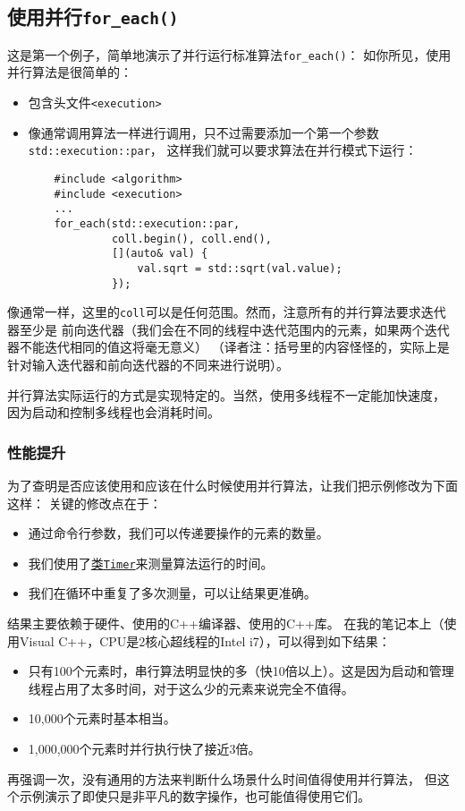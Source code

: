 \subsection{使用并行\texttt{for\_each()}}
这是第一个例子，简单地演示了并行运行标准算法\texttt{for\_each()}：
如你所见，使用并行算法是很简单的：
\begin{itemize}
    \item 包含头文件\texttt{<execution>}
    \item 像通常调用算法一样进行调用，只不过需要添加一个第一个参数\texttt{std::execution::par}，
    这样我们就可以要求算法在并行模式下运行：
    \begin{lstlisting}
    #include <algorithm>
    #include <execution>
    ...
    for_each(std::execution::par,
             coll.begin(), coll.end(),
             [](auto& val) {
                 val.sqrt = std::sqrt(val.value);
             });
    \end{lstlisting}
\end{itemize}
像通常一样，这里的\texttt{coll}可以是任何范围。然而，注意所有的并行算法要求迭代器至少是
前向迭代器（我们会在不同的线程中迭代范围内的元素，如果两个迭代器不能迭代相同的值这将毫无意义）
（译者注：括号里的内容怪怪的，实际上是针对输入迭代器和前向迭代器的不同来进行说明）。

并行算法实际运行的方式是实现特定的。当然，使用多线程不一定能加快速度，
因为启动和控制多线程也会消耗时间。

\subsubsection{性能提升}
为了查明是否应该使用和应该在什么时候使用并行算法，让我们把示例修改为下面这样：
关键的修改点在于：
\begin{itemize}
    \item 通过命令行参数，我们可以传递要操作的元素的数量。
    \item 我们使用了\hyperref[ch22.0.0.1]{类\texttt{Timer}}来测量算法运行的时间。
    \item 我们在循环中重复了多次测量，可以让结果更准确。
\end{itemize}
结果主要依赖于硬件、使用的C++编译器、使用的C++库。
在我的笔记本上（使用Visual C++，CPU是2核心超线程的Intel i7），可以得到如下结果：
\begin{itemize}
    \item 只有100个元素时，串行算法明显快的多（快10倍以上）。这是因为启动和管理线程占用了太多时间，对于这么少的元素来说完全不值得。
    \item 10,000个元素时基本相当。
    \item 1,000,000个元素时并行执行快了接近3倍。
\end{itemize}
再强调一次，没有通用的方法来判断什么场景什么时间值得使用并行算法，
但这个示例演示了即使只是非平凡的数字操作，也可能值得使用它们。

